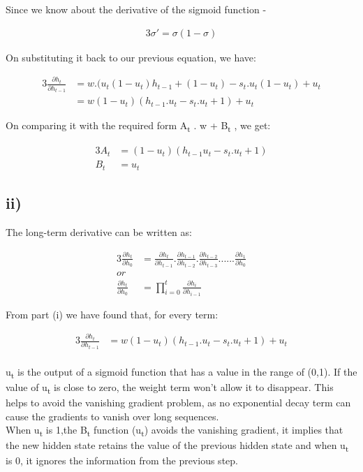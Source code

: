 Since we know about the derivative of the sigmoid function - 

\begin{alignat}{3}
\sigma' = \sigma(1-\sigma)
\end{alignat}

On substituting it back to our previous equation, we have:

\begin{alignat}{3}
\frac {\partial h_t}{\partial h_{t-1}} &= w.(u_t(1-u_t)h_{t-1} + (1-u_t) - s_t.u_t(1-u_t) +u_t
\\ &= w(1-u_t)(h_{t-1}.u_t-s_t.u_t +1) + u_t
\end{alignat}


On comparing it with the required form A\textsubscript{t} . w + B\textsubscript{t} , we get:

\begin{alignat}{3}
A_t &= (1-u_t)(h_{t-1}u_t - s_t.u_t+1)
\\B_t &= u_t
\end{alignat}

\subsection*{ii)}

The long-term derivative can be written as:

\begin{alignat}{3}
\frac {\partial h_t}{\partial h_0} &= \frac {\partial h_t}{\partial h_{t-1}} . \frac {\partial h_{t-1}}{\partial h_{t-2}}. \frac {\partial h_{t-2}}{\partial h_{t-3}}...... \frac {\partial h_1}{\partial h_0} 
\\or
\\
\frac {\partial h_t}{\partial h_0} &= \prod_{i=0}^{t} \frac{\partial h_i}{\partial h_{i-1}}
\end{alignat}

From part (i) we have found that, for every term:

\begin{alignat}{3}
\frac {\partial h_t}{\partial h_{t-1}} &= w(1-u_t)(h_{t-1}.u_t-s_t.u_t +1) + u_t
\end{alignat}\\
u\textsubscript{t} is the output of a sigmoid function that has a value in the range of (0,1). If the value of u\textsubscript{t} is close to zero, the weight term won’t allow it to disappear. This helps to avoid the vanishing gradient problem, as no exponential decay term can cause the gradients to vanish over long sequences.\\
When u\textsubscript{t} is 1,the B\textsubscript{t} function (u\textsubscript{t}) avoids the vanishing gradient, it implies that the new hidden state retains the value of the previous hidden state and when u\textsubscript{t} is 0, it ignores the information from the previous step.




